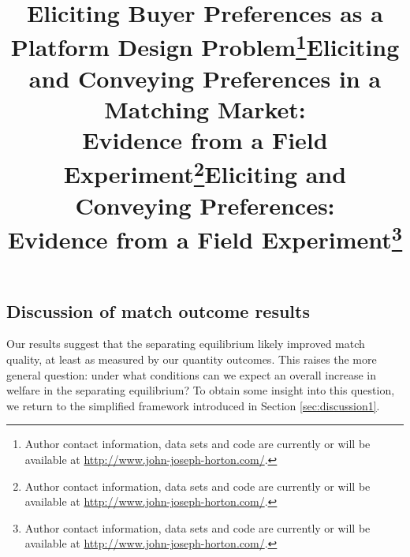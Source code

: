 \title{Eliciting Buyer Preferences as a Platform Design Problem\footnote{Author contact information, data sets and code are
     currently or will be available at
     \href{http://www.john-joseph-horton.com/}{http://www.john-joseph-horton.com/}.}}

\title{Eliciting and Conveying Preferences in a Matching Market: \\
  Evidence from a Field Experiment\footnote{Author contact information, data sets and code are
     currently or will be available at
     \href{http://www.john-joseph-horton.com/}{http://www.john-joseph-horton.com/}.}}


\title{Eliciting and Conveying Preferences: \\
  Evidence from a Field Experiment\footnote{Author contact information, data sets and code are
     currently or will be available at
     \href{http://www.john-joseph-horton.com/}{http://www.john-joseph-horton.com/}.}}


\subsection{Discussion of match outcome results}

Our results suggest that the separating equilibrium likely improved match quality, at least as measured by our quantity outcomes. 
This raises the more general question: under what conditions can we expect an overall increase in welfare in the separating equilibrium?
To obtain some insight into this question, we return to the simplified framework introduced in Section \ref{sec:discussion1}.  

